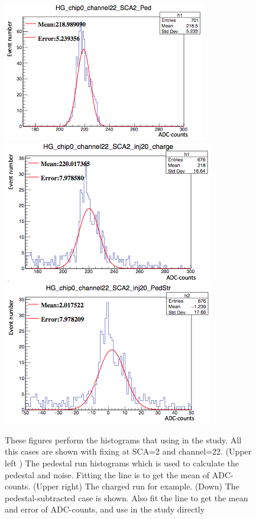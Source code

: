 \begin{figure}[!htb]
\centering
     \includegraphics[width=\cmsFigWidth]{PCB_study/His_Pedestal.png}
     \includegraphics[width=\cmsFigWidth]{PCB_study/His_charge.png}\\
     \includegraphics[width=\cmsFigWidth]{PCB_study/His_subtraction.png}
\caption{These figures perform the histograms that using in the study. All this cases are shown with fixing at SCA=2 and channel=22. (Upper left ) The pedestal run histograms which is used to calculate the pedestal and noise. Fitting the line is to get the mean of ADC-counts. (Upper right)  The charged run for example. (Down) The pedestal-subtracted case is shown. Also fit the line to get the mean and error of ADC-counts, and use in the study directly}
\label{fig:PCB_His}
\end{figure}

